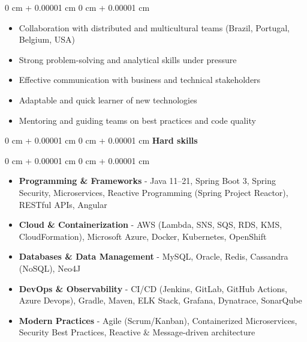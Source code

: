 \documentclass[10pt, letterpaper]{article}
\newenvironment{highlights}{
    \begin{itemize}[
        topsep=0.10 cm,
        parsep=0.10 cm,
        partopsep=0pt,
        itemsep=0pt,
        leftmargin=0 cm + 10pt
    ]
}{
    \end{itemize}
} %
\newenvironment{onecolentry}{
    \begin{adjustwidth}{
        0 cm + 0.00001 cm
    }{
        0 cm + 0.00001 cm
    }
}{
    \end{adjustwidth}
} %
\begin{document}
        \vspace{0.10 cm}

        \begin{onecolentry}
            \begin{highlights}
                \item Collaboration with distributed and multicultural teams (Brazil, Portugal, Belgium, USA)
                \item Strong problem-solving and analytical skills under pressure
                \item Effective communication with business and technical stakeholders
                \item Adaptable and quick learner of new technologies
                \item Mentoring and guiding teams on best practices and code quality
            \end{highlights}
        \end{onecolentry}

        \vspace{0.2 cm}

        \begin{onecolentry} \textbf{Hard skills}\end{onecolentry}

        \vspace{0.10 cm}

        \begin{onecolentry}
            \begin{highlights}
                \item \textbf{Programming \& Frameworks} - Java 11–21, Spring Boot 3, Spring Security, Microservices, Reactive Programming (Spring Project Reactor), RESTful APIs, Angular
                \item \textbf{Cloud \& Containerization} - AWS (Lambda, SNS, SQS, RDS, KMS, CloudFormation), Microsoft Azure, Docker, Kubernetes, OpenShift
                \item \textbf{Databases \& Data Management} - MySQL, Oracle, Redis, Cassandra (NoSQL), Neo4J
                \item \textbf{DevOps \& Observability} - CI/CD (Jenkins, GitLab, GitHub Actions, Azure Devops), Gradle, Maven, ELK Stack, Grafana, Dynatrace, SonarQube
                \item \textbf{Modern Practices} - Agile (Scrum/Kanban), Containerized Microservices, Security Best Practices, Reactive \& Message-driven architecture
            \end{highlights}
        \end{onecolentry}
\end{document}
